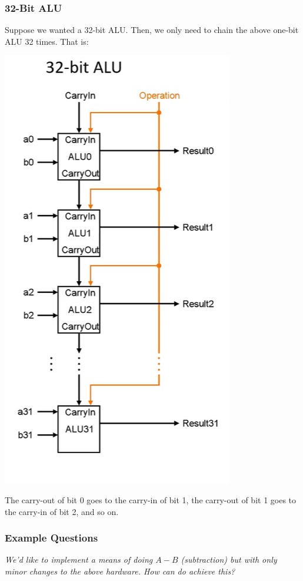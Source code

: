 \documentclass[letterpaper]{article}
\begin{document}
\subsubsection{32-Bit ALU}
Suppose we wanted a 32-bit ALU. Then, we only need to chain the above one-bit ALU 32 times. That is:
\begin{center}
    \includegraphics[scale=0.5]{32b_alu.PNG}
\end{center}
The carry-out of bit 0 goes to the carry-in of bit 1, the carry-out of bit 1 goes to the carry-in of bit 2, and so on.

\subsubsection{Example Questions}
\emph{We'd like to implement a means of doing $A - B$ (subtraction) but with only minor changes to the above hardware. How can do achieve this?}
\end{document}
